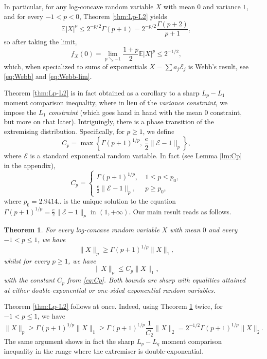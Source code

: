 \documentclass[10pt]{amsart}
\newcommand{\E}{\mathbb{E}}
\newcommand{\1}{\textbf{1}}
\newcommand{\red}{}
\newcommand{\cE}{\mathcal{E}}
\newtheorem{theorem}{Theorem}
\theoremstyle{remark}
\theoremstyle{definition}
\begin{document}
In particular, for any log-concave random variable $X$ with mean $0$ {\red and} variance $1$, and for every $-1 < p < 0$, Theorem \ref{thm:Lp-L2} yields
\[ 
\E|X|^p \leq 2^{-p/2}\Gamma(p+1) = 2^{-p/2}\frac{\Gamma(p+2)}{p+1}, 
 \]
so after taking the limit,
\[ 
f_X(0) = \lim_{p \searrow -1} \frac{1+p}{2}\E|X|^p \leq 2^{-1/2},
 \]
which, when specialized to sums of exponentials $X = \sum a_j\cE_j$ is Webb's result, see \eqref{eq:Webb} and \eqref{eq:Webb-lim}.

Theorem \ref{thm:Lp-L2} is in fact obtained as a corollary to  a sharp $L_p - L_1$ moment comparison inequality, where in lieu of the \emph{variance constraint}, we impose the \emph{$L_1$ constraint} (which goes hand in hand with the mean $0$ constraint, but more on that later). Intriguingly, there is a phase transition of the extremising distribution. Specifically, for $p \geq 1$, we define
\begin{equation}\label{eq:def-Cp}
C_p = \max\left\{\Gamma(p+1)^{1/p}, \ \frac{e}{2}\|\cE-1\|_p  \right\},
\end{equation}
where $\cE$ is a standard exponential random variable. In fact (see Lemma \ref{lm:Cp} in the appendix),
\begin{equation}\label{eq:Cp}
C_p =\begin{cases}\Gamma(p+1)^{1/p}, \ &1 \leq p \leq p_0, \\ 
\frac{e}{2}\|\cE-1\|_p, \ &p \geq p_0,
\end{cases}
\end{equation}
where $p_0 = 2.9414..$ is the unique solution to the equation $\Gamma(p+1)^{1/p} = \frac{e}{2}\|\cE-1\|_p$ in $(1, +\infty)$. Our main result reads as follows.




\begin{theorem}\label{thm:Lp-L1}
For every log-concave random variable $X$ with mean $0$ and every $-1 < p \leq 1$, we have
\begin{equation}\label{eq:Lp-L1-p<1}
\|X\|_p \geq \Gamma(p+1)^{1/p}\|X\|_1,
 \end{equation}
whilst for every $p \geq 1$, we have
\begin{equation}\label{eq:Lp-L1-p>1}
\|X\|_p \leq C_p\|X\|_1,
\end{equation}
with the constant $C_p$ from \eqref{eq:Cp}.
Both bounds are sharp with equalities attained at either double-exponential or one-sided exponential random variables.
\end{theorem}


Theorem \ref{thm:Lp-L2} follows at once. Indeed, using Theorem \ref{thm:Lp-L1} twice, for $-1 < p \leq 1$, we have
\[ 
\|X\|_p \geq \Gamma(p+1)^{1/p}\|X\|_1 \geq \Gamma(p+1)^{1/p}\frac{1}{C_2}\|X\|_2 =  2^{-1/2}\Gamma(p+1)^{1/p}\|X\|_2.
 \]
The same argument shows in fact the sharp $L_p - L_q$ moment comparison inequality in the range where the extremiser is double-exponential.
\end{document}
